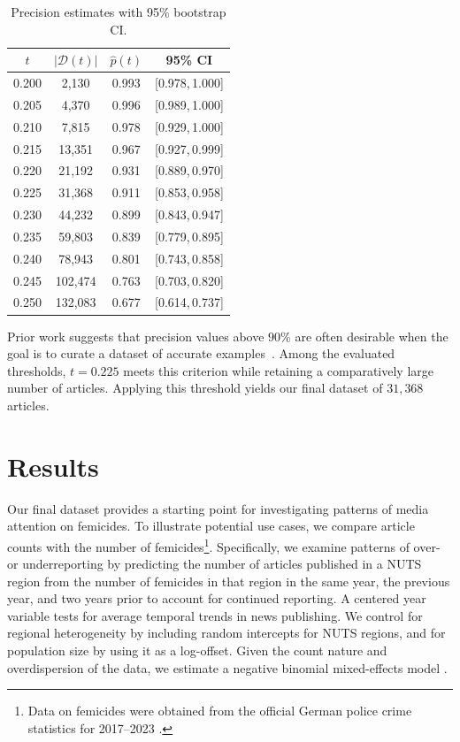 \documentclass{article}
\begin{document}
\begin{table}[h]
\vspace{-5pt}
\centering
\small
\caption{Precision estimates with 95\% bootstrap CI.}
\label{tab:precision_ci}
\begin{tabular}{cccc}
\toprule
$t$ & $|\mathcal{D}(t)|$ & $\hat p(t)$ & 95\% CI \\
\midrule
0.200 & 2{,}130   & 0.993 & [0.978,\,1.000] \\
0.205 & 4{,}370   & 0.996 & [0.989,\,1.000] \\
0.210 & 7{,}815   & 0.978 & [0.929,\,1.000] \\
0.215 & 13{,}351  & 0.967 & [0.927,\,0.999] \\
0.220 & 21{,}192  & 0.931 & [0.889,\,0.970] \\
0.225 & 31{,}368  & 0.911 & [0.853,\,0.958] \\
0.230 & 44{,}232  & 0.899 & [0.843,\,0.947] \\
0.235 & 59{,}803  & 0.839 & [0.779,\,0.895] \\
0.240 & 78{,}943  & 0.801 & [0.743,\,0.858] \\
0.245 & 102{,}474 & 0.763 & [0.703,\,0.820] \\
0.250 & 132{,}083 & 0.677 & [0.614,\,0.737] \\
\bottomrule
\end{tabular}
\end{table}
Prior work suggests that precision values above $90\%$ are often desirable when the goal is to curate a dataset of accurate examples~\citep{ning2025optimizingdataextractionmaterials}. Among the evaluated thresholds, $t = 0.225$ meets this criterion while retaining a comparatively large number of articles. Applying this threshold yields our final dataset of $31{,}368$ articles.

\section{Results}\label{sec:results}

Our final dataset provides a starting point for investigating patterns of media attention on femicides. To illustrate potential use cases, we compare article counts with the number of femicides\footnote{Data on femicides were obtained from the official German police crime statistics for 2017–2023 \citep{bkaPolizeilicheKriminalstatistik}.}. Specifically, we examine patterns of over- or underreporting by predicting the number of articles published in a NUTS region from the number of femicides in that region 
in the same year, the previous year, and two years prior to account for continued reporting. A centered year variable tests for average temporal trends in news publishing. We control for regional heterogeneity by including random intercepts for NUTS regions, and for population size by using it as a log-offset. Given the count nature and overdispersion of the data, we estimate a negative binomial mixed-effects model \citep{zeileis2008regressionmodelscount}. 
\end{document}
